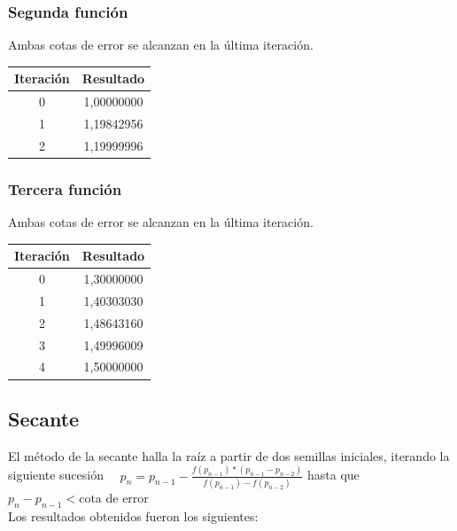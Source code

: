 \documentclass[titlepage,a4paper]{article}
\begin{document}
\subsubsection{Segunda función}\label{sec:NRM2}
Ambas cotas de error se alcanzan en la última iteración.
\begin{center}
    \begin{tabular}{| c | c |}
    \hline
     Iteración & Resultado \\ \hline
    0     & 1,00000000 \\
        1     & 1,19842956 \\
        2     & 1,19999996 \\
    \hline
    \end{tabular}
\end{center}
\subsubsection{Tercera función}\label{sec:NRM3}
Ambas cotas de error se alcanzan en la última iteración.
\begin{center}
    \begin{tabular}{| c | c |}
    \hline
     Iteración & Resultado \\ \hline
        0     & 1,30000000 \\
        1     & 1,40303030 \\
        2     & 1,48643160 \\
        3     & 1,49996009 \\
        4     & 1,50000000 \\
    \hline
    \end{tabular}
\end{center}

\subsection{Secante}\label{sec:biseccion}
El método de la secante halla la raíz a partir de dos semillas iniciales, iterando la siguiente sucesión
$\quad p_{n} =p_{n-1}-\frac{f (p_{n-1})*(p_{n-1}-p_{n-2})}{f(p_{n-1})-f(p_{n-2})}$ hasta que $p_{n}-p_{n-1} < \mbox{cota de error}$
\\

Los resultados obtenidos fueron los siguientes:
\end{document}
